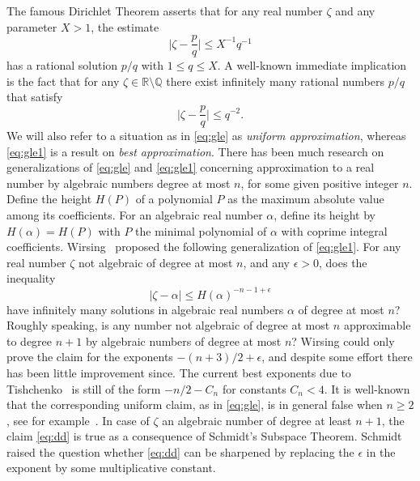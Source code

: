\documentclass[12pt]{amsart}
\theoremstyle{definition}
\begin{document}
The famous Dirichlet Theorem asserts that for any real number $\zeta$
and any parameter $X>1$, the estimate
%
\begin{equation} \label{eq:gle}
\vert \zeta-\frac{p}{q}\vert \leq X^{-1}q^{-1}
\end{equation}
%
has a rational solution $p/q$ with $1\leq q\leq X$.
A well-known immediate implication is the fact that for
any $\zeta\in \mathbb{R}\setminus \mathbb{Q}$
there exist infinitely many rational numbers $p/q$ that satisfy
%
\begin{equation} \label{eq:gle1}
\vert \zeta-\frac{p}{q}\vert \leq q^{-2}.
\end{equation}
%
We will also refer to a situation as in \eqref{eq:gle}
as {\em uniform approximation}, whereas \eqref{eq:gle1} 
is a result on {\em best approximation}. 
There has been much research on generalizations 
of \eqref{eq:gle} and \eqref{eq:gle1} concerning
approximation to a real number by 
algebraic numbers degree at most $n$, 
for some given positive integer $n$. 
Define the height $H(P)$ of a polynomial $P$ 
as the maximum absolute value among its coefficients. For 
an algebraic real number $\alpha$, define its height by $H(\alpha)=H(P)$ with $P$ the minimal
polynomial of $\alpha$ with coprime integral coefficients.
Wirsing~\cite{wirsing} proposed the following generalization of
\eqref{eq:gle1}.
For any real number $\zeta$ not algebraic of degree at most $n$,
and any $\epsilon>0$, does the inequality
%
\begin{equation} \label{eq:dd}
\vert \zeta-\alpha\vert \leq H(\alpha)^{-n-1+\epsilon}
\end{equation}
% 
have infinitely many solutions in algebraic real 
numbers $\alpha$ of degree at most $n$? 
Roughly speaking, is any number not algebraic of degree at most $n$
approximable to degree $n+1$ by algebraic numbers 
of degree at most $n$?
Wirsing could only prove the claim for the 
exponents $-(n+3)/2+\epsilon$,
and despite some effort there has been little improvement since. 
The current 
best exponents due to Tishchenko~\cite{Tsi07} is 
still of the form $-n/2-C_{n}$ for constants $C_{n}<4$.
It is well-known that the corresponding uniform claim, as in \eqref{eq:gle},
is in general false when $n\geq 2$, 
see for example~\cite[Theorem~2.4]{bschlei}.
In case of $\zeta$ an algebraic number of degree at least $n+1$,
the claim \eqref{eq:dd} is true as a consequence of Schmidt's Subspace Theorem. 
Schmidt~\cite{512} raised the question whether \eqref{eq:dd} 
can be sharpened by replacing  the
$\epsilon$ in the exponent by some multiplicative constant. 
\end{document}
